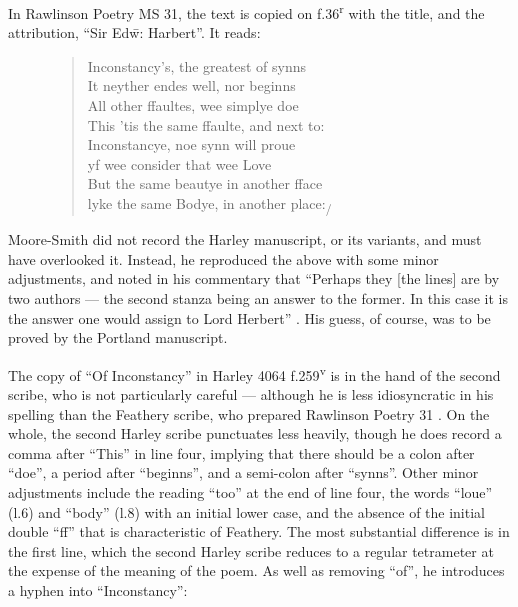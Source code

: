 \begin{paper}
In Rawlinson Poetry MS 31, the text is copied on f.36\textsuperscript{r}
with the title, and the attribution, ``Sir Ed\={w}: Harbert''. It reads:

\begin{figure}[H]
\begin{quote}
Inconstancy's, the greatest of synns \\
It neyther endes well, nor beginns \\
All other ffaultes, wee simplye doe \\
This 'tis the same ffaulte, and next to: \\

Inconstancye, noe synn will proue \\
yf wee consider that wee Love \\
But the same beautye in another fface \\
lyke the same Bodye, in another place:\textsubscript{/}
\end{quote}
\end{figure}

\noindent Moore-Smith did not record the Harley manuscript, or its variants, and
must have overlooked it. Instead, he reproduced the above with some
minor adjustments, and noted in his commentary that ``Perhaps they {[}the
lines{]} are by two authors --- the second stanza being an answer to the
former. In this case it is the answer one would assign to Lord Herbert'' \citep[167]{moore_smith_poems_1923}. His guess, of course, was to be proved by the
Portland manuscript.

The copy of ``Of Inconstancy'' in Harley 4064 f.259\textsuperscript{v} is
in the hand of the second scribe, who is not particularly
careful --- although he is less idiosyncratic in his spelling than the
Feathery scribe, who prepared Rawlinson Poetry 31 \citep{beal_praise_1998}. On the
whole, the second Harley scribe punctuates less heavily, though he does
record a comma after ``This'' in line four, implying that there should be
a colon after ``doe'', a period after ``beginns'', and a semi-colon after
``synns''. Other minor adjustments include the reading ``too'' at the end of
line four, the words ``loue'' (l.6) and ``body'' (l.8) with an initial lower
case, and the absence of the initial double ``ff'' that is characteristic
of Feathery. The most substantial difference is in the first line, which
the second Harley scribe reduces to a regular tetrameter at the expense
of the meaning of the poem. As well as removing ``of'', he introduces a
hyphen into ``Inconstancy'':


\end{paper}
